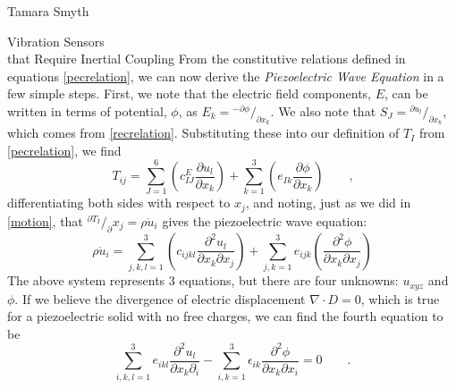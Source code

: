 \documentclass[a4paper,10pt]{report}
\numberwithin{equation}{section}
\begin{document}
\begin{chapter}{Tamara Smyth}
\begin{section}{Vibration Sensors \\that Require Inertial Coupling}
From the constitutive relations defined in equations \eqref{pecrelation}, we can now derive the \emph{Piezoelectric Wave Equation} in a few simple steps. First, we note that the electric field components, $E$, can be written in terms of potential, $\phi$, as $E_k = {}^{-\partial \phi}/_{\partial x_k}$. We also note that $S_J = {}^{\partial u_l}/_{\partial x_k}$, which comes from \eqref{recrelation}. Substituting these into our definition of $T_I$ from \eqref{pecrelation}, we find\cite[p.~26]{Ballantine1997}
\begin{equation}
T_{ij} = \sum_{J=1}^6 \left( c_{IJ}^E \frac{\partial u_l}{\partial x_k}\right) + \sum_{k=1}^3 \left( e_{Ik} \frac{\partial \phi}{\partial x_k} \right) \qquad \text{,}
\end{equation}
differentiating both sides with respect to $x_j$, and noting, just as we did in \eqref{motion}, that ${}^{\partial T_I} /_\partial x_j = \rho \ddot{u}_i$ gives the piezoelectric wave equation\cite[p.~27]{Ballantine1997}:
\begin{equation}\label{pwaveq}
\rho\ddot{u}_i = \sum_{j,k,l = 1}^3 \left( c_{ijkl} \frac{\partial^2 u_l}{\partial x_k \partial x_j} \right) 
+ \sum_{j,k=1}^3 e_{ijk}\left( \frac{\partial^2 \phi}{\partial x_k \partial x_j} \right)
\end{equation}
The above system represents 3 equations, but there are four unknowns: $u_{xyz}$ and $\phi$. If we believe the divergence of electric displacement $\nabla \cdot D = 0$, which is true for a piezoelectric solid with no free charges, we can find the fourth equation to be\cite[p.~27]{Ballantine1997}
\begin{equation}\label{pwaveq_phi}
\sum_{i,k,l=1}^3 e_{ikl}\frac{\partial^2 u_l}{\partial x_k \partial_i} - \sum_{i,k=1}^3 \epsilon_{ik} \frac{\partial^2 \phi}{\partial x_k \partial x_i} = 0 \qquad \text{.}
\end{equation}


\end{section}
\end{chapter}
\end{document}

